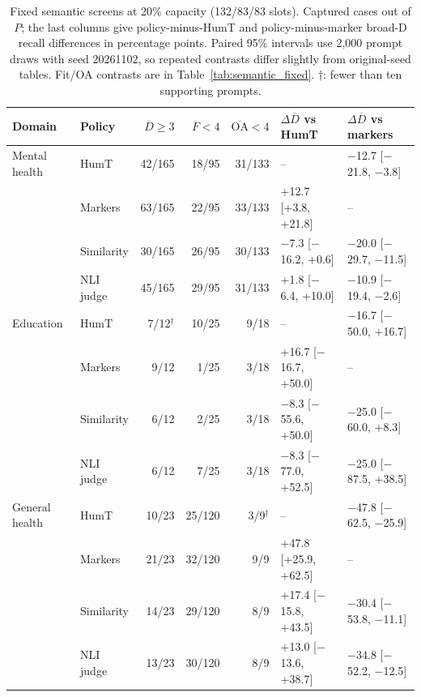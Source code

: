 \begin{table}[t]
\centering\small
\caption{Fixed semantic screens at 20\% capacity (132/83/83 slots). Captured cases out of $P$; the last columns give policy-minus-HumT and policy-minus-marker broad-D recall differences in percentage points. Paired 95\% intervals use 2,000 prompt draws with seed 20261102, so repeated contrasts differ slightly from original-seed tables. Fit/OA contrasts are in Table~\ref{tab:semantic_fixed}. $\dagger$: fewer than ten supporting prompts.}
\label{tab:semantic_compact}
\begin{tabular}{llrrrll}
\toprule
Domain & Policy & $\overline D\geq3$ & $\overline F<4$ & $\overline{\mathrm{OA}}<4$ & $\Delta\overline D$ vs HumT & $\Delta\overline D$ vs markers \\
\midrule
Mental health & HumT & 42/165 & 18/95 & 31/133 & -- & \ensuremath{-}12.7 [\ensuremath{-}21.8, \ensuremath{-}3.8] \\
 & Markers & 63/165 & 22/95 & 33/133 & +12.7 [+3.8, +21.8] & -- \\
 & Similarity & 30/165 & 26/95 & 30/133 & \ensuremath{-}7.3 [\ensuremath{-}16.2, +0.6] & \ensuremath{-}20.0 [\ensuremath{-}29.7, \ensuremath{-}11.5] \\
 & NLI judge & 45/165 & 29/95 & 31/133 & +1.8 [\ensuremath{-}6.4, +10.0] & \ensuremath{-}10.9 [\ensuremath{-}19.4, \ensuremath{-}2.6] \\
\addlinespace
Education & HumT & 7/12$^{\dagger}$ & 10/25 & 9/18 & -- & \ensuremath{-}16.7 [\ensuremath{-}50.0, +16.7] \\
 & Markers & 9/12 & 1/25 & 3/18 & +16.7 [\ensuremath{-}16.7, +50.0] & -- \\
 & Similarity & 6/12 & 2/25 & 3/18 & \ensuremath{-}8.3 [\ensuremath{-}55.6, +50.0] & \ensuremath{-}25.0 [\ensuremath{-}60.0, +8.3] \\
 & NLI judge & 6/12 & 7/25 & 3/18 & \ensuremath{-}8.3 [\ensuremath{-}77.0, +52.5] & \ensuremath{-}25.0 [\ensuremath{-}87.5, +38.5] \\
\addlinespace
General health & HumT & 10/23 & 25/120 & 3/9$^{\dagger}$ & -- & \ensuremath{-}47.8 [\ensuremath{-}62.5, \ensuremath{-}25.9] \\
 & Markers & 21/23 & 32/120 & 9/9 & +47.8 [+25.9, +62.5] & -- \\
 & Similarity & 14/23 & 29/120 & 8/9 & +17.4 [\ensuremath{-}15.8, +43.5] & \ensuremath{-}30.4 [\ensuremath{-}53.8, \ensuremath{-}11.1] \\
 & NLI judge & 13/23 & 30/120 & 8/9 & +13.0 [\ensuremath{-}13.6, +38.7] & \ensuremath{-}34.8 [\ensuremath{-}52.2, \ensuremath{-}12.5] \\
\bottomrule
\end{tabular}
\end{table}
